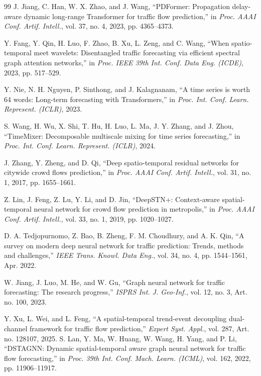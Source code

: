 \begin{thebibliography}{99}
J. Jiang, C. Han, W. X. Zhao, and J. Wang, ``PDFormer: Propagation delay-aware dynamic long-range Transformer for traffic flow prediction,'' in \emph{Proc. AAAI Conf. Artif. Intell.}, vol. 37, no. 4, 2023, pp. 4365--4373.

Y. Fang, Y. Qin, H. Luo, F. Zhao, B. Xu, L. Zeng, and C. Wang, ``When spatio-temporal meet wavelets: Disentangled traffic forecasting via efficient spectral graph attention networks,'' in \emph{Proc. IEEE 39th Int. Conf. Data Eng. (ICDE)}, 2023, pp. 517--529.

Y. Nie, N. H. Nguyen, P. Sinthong, and J. Kalagnanam, ``A time series is worth 64 words: Long-term forecasting with Transformers,'' in \emph{Proc. Int. Conf. Learn. Represent. (ICLR)}, 2023.

S. Wang, H. Wu, X. Shi, T. Hu, H. Luo, L. Ma, J. Y. Zhang, and J. Zhou, ``TimeMixer: Decomposable multiscale mixing for time series forecasting,'' in \emph{Proc. Int. Conf. Learn. Represent. (ICLR)}, 2024.

J. Zhang, Y. Zheng, and D. Qi, ``Deep spatio-temporal residual networks for citywide crowd flows prediction,'' in \emph{Proc. AAAI Conf. Artif. Intell.}, vol. 31, no. 1, 2017, pp. 1655--1661.

Z. Lin, J. Feng, Z. Lu, Y. Li, and D. Jin, ``DeepSTN+: Context-aware spatial-temporal neural network for crowd flow prediction in metropolis,'' in \emph{Proc. AAAI Conf. Artif. Intell.}, vol. 33, no. 1, 2019, pp. 1020--1027.

D. A. Tedjopurnomo, Z. Bao, B. Zheng, F. M. Choudhury, and A. K. Qin, ``A survey on modern deep neural network for traffic prediction: Trends, methods and challenges,'' \emph{IEEE Trans. Knowl. Data Eng.}, vol. 34, no. 4, pp. 1544--1561, Apr. 2022.

W. Jiang, J. Luo, M. He, and W. Gu, ``Graph neural network for traffic forecasting: The research progress,'' \emph{ISPRS Int. J. Geo-Inf.}, vol. 12, no. 3, Art. no. 100, 2023.

Y. Xu, L. Wei, and L. Feng, ``A spatial-temporal trend-event decoupling dual-channel framework for traffic flow prediction,'' \emph{Expert Syst. Appl.}, vol. 287, Art. no. 128107, 2025.
S. Lan, Y. Ma, W. Huang, W. Wang, H. Yang, and P. Li,
``DSTAGNN: Dynamic spatial-temporal aware graph neural network for traffic flow forecasting,''
in \emph{Proc. 39th Int. Conf. Mach. Learn. (ICML)},
vol. 162, 2022, pp. 11906--11917.


\end{thebibliography}
